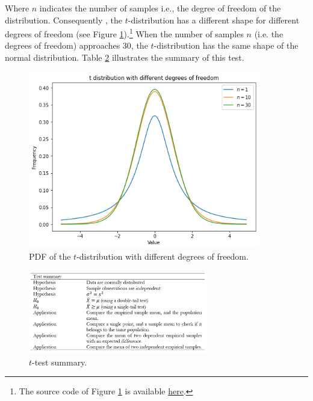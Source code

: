 Where $n$ indicates the number of samples i.e., the degree of freedom of the distribution. Consequently , the $t$-distribution has a different shape for different degrees of freedom (see Figure \ref{fig_tDist}).\footnote{The source code of Figure \ref{fig_tDist} is available \href{https://github.com/aletuf93/logproj/blob/master/examples/03.\%20Statistics.ipynb}{here}.} When the number of samples $n$ (i.e. the degrees of freedom) approaches $30$, the $t$-distribution has the same shape of the normal distribution. Table \ref{tab_tTest} illustrates the summary of this test.

\begin{figure}[hbt!]
\centering
\includegraphics[width=0.9\textwidth]{SectionLetsMath/elemStat_figures/fig_tDist.png}
\captionsetup{type=figure}
\caption{PDF of the $t$-distribution with different degrees of freedom.}
\label{fig_tDist}
\end{figure}

\begin{figure}[hbt!]
\centering
\includegraphics[width=0.7\textwidth]{SectionLetsMath/elemStat_figures/tab_tTest.png}
\captionsetup{type=table}
\caption{$t$-test summary.}
\label{tab_tTest}
\end{figure}

